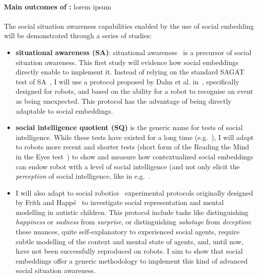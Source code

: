 \paragraph{\TDA}

\begin{framed}
    {\noindent\bf Main outcomes of \tDA:} lorem ipsum 
\end{framed}

\paragraph{\TDB}

The social situation awareness capabilities enabled by the use of social embedding will be
demonstrated through a series of studies:

\begin{itemize}
    \item {\bf situational awareness (SA)}: situational
        awareness~\cite{endsley1995theory} is a precursor of social situation
        awareness. This first study will evidence how social embeddings directly
        enable to implement it. Instead of relying on the standard SAGAT test of
        SA~\cite{endsley2017direct}, I will use a protocol proposed by Dahn et
        al. in~\cite{dahn2018situation}, specifically designed for robots, and
        based on the ability for a robot to recognise an event as being
        unexpected. This protocol has the advantage of being directly adaptable
        to social embeddings.

    \item {\bf social intelligence quotient (SQ)} is the generic name for tests
        of social intelligence. While these tests have existed for a long time
        (e.g.~\cite{moss1930social}), I will adapt to robots more recent and shorter tests
        (short form of the Reading the Mind in the Eyes
        test~\cite{olderbak2015psychometric}) to show and measure how contextualized social
        embeddings can endow robot with a level of social intelligence (and not
        only elicit the \emph{perception} of social intelligence, like in
        e.g.~\cite{barchard2020measuring}.

    \item I will also adapt to social robotics~\cite{lemaignan2015mutual}
        experimental protocols originally designed by Frith and
        Happé~\cite{frith1994autism} to investigate social representation and
        mental modelling in autistic children.  This protocol include tasks like
        distinguishing \emph{happiness} or \emph{sadness} from \emph{surprise},
        or distinguishing \emph{sabotage} from \emph{deception}: these nuances,
        quite self-explanatory to experienced social agents, require subtle
        modelling of the context and mental state of agents, and, until now,
        have not been successfully reproduced on robots. I aim to show that
        social embeddings offer a generic methodology to implement this kind of
        advanced social situation awareness.

\end{itemize}


